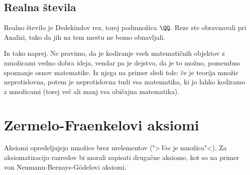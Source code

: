 \subsection{Realna števila}

Realno število je Dedekindov rez, torej podmnožica $\QQ$. Reze ste obravnavali pri Analizi, tako da jih na tem mestu ne
bomo obnavljali.

In tako naprej. Ne pravimo, da je kodiranje vseh matematičnih objektov z množicami vedno
dobra ideja, vendar pa je dejstvo, da je to možno, pomembno spoznanje osnov matematike. Iz
njega na primer sledi tole: če je teorija množic neprotislovna, potem je neprotislovna
tudi vsa matematika, ki jo lahko kodiramo z množicami (torej več ali manj vsa običajna
matematika).



\section{Zermelo-Fraenkelovi aksiomi}

Aksiomi opredeljujejo množice brez urelementov (">\emph{Vse} je množica"<). Za aksiomatizacijo razredov bi morali zapisati drugačne aksiome, kot so na primer von Neumann-Bernays-Gödelovi aksiomi.

